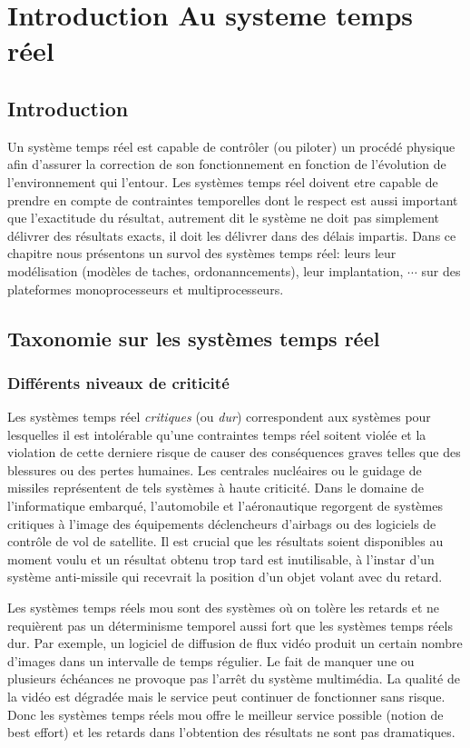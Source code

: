 \chapter{Introduction Au systeme temps réel}
\minitoc
\section{Introduction}

Un système temps réel est capable de contrôler (ou piloter) un procédé
physique afin d'assurer la correction de son fonctionnement en
fonction de l'évolution de l'environnement qui l'entour. Les systèmes
temps réel doivent etre capable de prendre en compte de contraintes
temporelles dont le respect est aussi important que l'exactitude du
résultat, autrement dit le système ne doit pas simplement délivrer des
résultats exacts, il doit les délivrer dans des délais impartis.  Dans
ce chapitre nous présentons un survol des systèmes temps réel: leurs
leur modélisation (modèles de taches, ordonanncements), leur
implantation, $\cdots$ sur des plateformes monoprocesseurs et
multiprocesseurs.

\section{Taxonomie sur les systèmes temps réel}
\subsection*{Différents niveaux de criticité}
Les systèmes temps réel \emph{critiques} (ou \emph{dur}) correspondent
aux systèmes pour lesquelles il est intolérable qu’une contraintes
temps réel soitent violée et la violation de cette derniere risque de
causer des conséquences graves telles que des blessures ou des pertes
humaines. Les centrales nucléaires ou le guidage de missiles
représentent de tels systèmes à haute criticité. Dans le domaine de
l’informatique embarqué, l’automobile et l’aéronautique regorgent de
systèmes critiques à l’image des équipements déclencheurs d’airbags ou
des logiciels de contrôle de vol de satellite. Il est crucial que les
résultats soient disponibles au moment voulu et un résultat obtenu
trop tard est inutilisable, à l’instar d’un système anti-missile qui
recevrait la position d’un objet volant avec du retard.

Les systèmes temps réels mou sont des systèmes où on tolère les
retards et ne requièrent pas un déterminisme temporel aussi fort que
les systèmes temps réels dur.  Par exemple, un logiciel de diffusion
de flux vidéo produit un certain nombre d’images dans un intervalle de
temps régulier. Le fait de manquer une ou plusieurs échéances ne
provoque pas l’arrêt du système multimédia. La qualité de la vidéo est
dégradée mais le service peut continuer de fonctionner sans
risque. Donc les systèmes temps réels mou offre le meilleur service
possible (notion de best effort) et les retards dans l’obtention des
résultats ne sont pas dramatiques.

